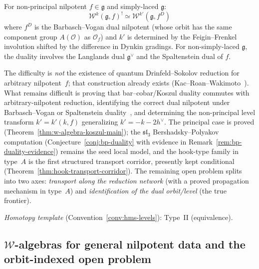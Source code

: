 \begin{conjecture}\label{conj:w-orbit-duality}
For non-principal nilpotent $f \in \mathfrak{g}$ and simply-laced $\mathfrak{g}$:
\begin{equation}
\mathcal{W}^k(\mathfrak{g}, f)^! \simeq \mathcal{W}^{k'}(\mathfrak{g}, f^D)
\end{equation}
where $f^D$ is the Barbasch--Vogan dual nilpotent (whose orbit has the same component group $A(\mathcal{O})$ as $\mathcal{O}_f$) and $k'$ is determined by the Feigin--Frenkel involution shifted by the difference in Dynkin gradings.  For non-simply-laced $\mathfrak{g}$, the duality involves the Langlands dual $\mathfrak{g}^\vee$ and the Spaltenstein dual of $f$.
\end{conjecture}

\begin{remark}[Scope]
The difficulty is \emph{not} the existence of quantum Drinfeld--Sokolov
reduction for arbitrary nilpotent~$f$; that construction already exists
(Kac--Roan--Wakimoto~\cite{KRW}).  What remains difficult is proving
that bar--cobar/Koszul duality commutes with arbitrary-nilpotent
reduction, identifying the correct dual nilpotent under Barbasch--Vogan
or Spaltenstein duality~\cite{BV85}, and determining the non-principal
level transform $k' = k'(k,f)$ generalizing $k' = -k - 2h^\vee$.
The principal case is proved
(Theorem~\ref{thm:w-algebra-koszul-main}); the
$\mathfrak{sl}_3$ Bershadsky--Polyakov computation
(Conjecture~\ref{conj:bp-duality} with evidence in
Remark~\ref{rem:bp-duality-evidence}) remains the seed local model,
and the hook-type family in type~$A$ is the first structured
transport corridor, presently kept conditional
(Theorem~\ref{thm:hook-transport-corridor}).  The remaining open
problem splits into
two axes:
\emph{transport along the reduction network}
(with a proved propagation mechanism in type~$A$) and
\emph{identification of the dual orbit/level}
(the true frontier).

\emph{Homotopy template} (Convention~\ref{conv:hms-levels}): Type~II (equivalence).
\end{remark}

\subsection{$\mathcal{W}$-algebras for general nilpotent data and the orbit-indexed open problem}
\label{sec:general-nilpotent-duality}


